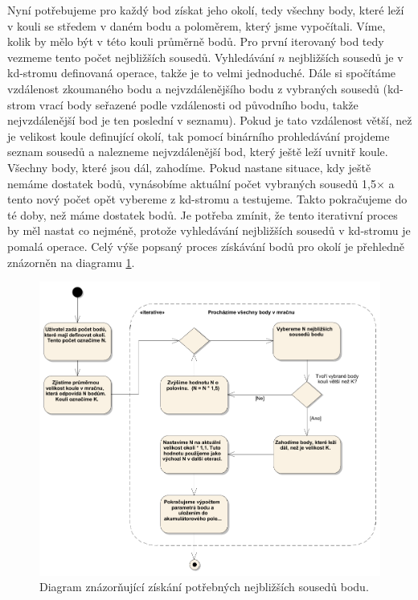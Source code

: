 \documentclass[11pt,twoside,a4paper]{book}
\begin{document}
Nyní potřebujeme pro každý bod získat jeho okolí, tedy všechny body, které leží v kouli se středem v daném bodu a poloměrem, který jsme vypočítali. Víme, kolik by mělo být v této kouli průměrně bodů. Pro první iterovaný bod tedy vezmeme tento počet nejbližších sousedů. Vyhledávání $n$ nejbližších sousedů je v kd-stromu definovaná operace, takže je to velmi jednoduché. Dále si spočítáme vzdálenost zkoumaného bodu a nejvzdálenějšího bodu z vybraných sousedů (kd-strom vrací body seřazené podle vzdálenosti od původního bodu, takže nejvzdálenější bod je ten poslední v seznamu). Pokud je tato vzdálenost větší, než je velikost koule definující okolí, tak pomocí binárního prohledávání projdeme seznam sousedů a nalezneme nejvzdálenější bod, který ještě leží uvnitř koule. Všechny body, které jsou dál, zahodíme. Pokud nastane situace, kdy ještě nemáme dostatek bodů, vynásobíme aktuální počet vybraných sousedů 1,5$\times$ a tento nový počet opět vybereme z kd-stromu a testujeme. Takto pokračujeme do té doby, než máme dostatek bodů. Je potřeba zmínit, že tento iterativní proces by měl nastat co nejméně, protože vyhledávání nejbližších sousedů v kd-stromu je pomalá operace. Celý výše popsaný proces získávání bodů pro okolí je přehledně znázorněn na diagramu \ref{fig:diag-okoli}.

\begin{figure}[ht]
\begin{center}
\includegraphics[width=\textwidth]{figures/okoli-diagram-algoritmus}
\caption{Diagram znázorňující získání potřebných nejbližších sousedů bodu.}
\label{fig:diag-okoli}
\end{center}
\end{figure}
\end{document}
